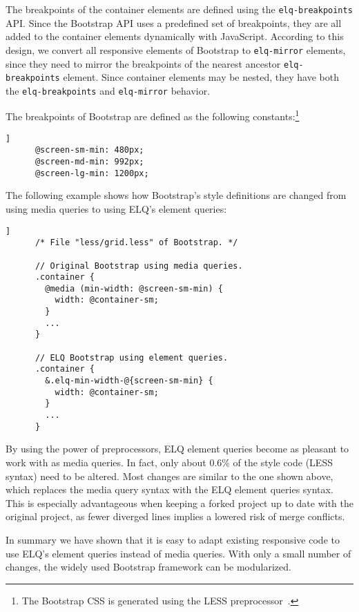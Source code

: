 \documentclass[sigconf,9pt]{acmart}
\newcommand{\elq}{ELQ}
\newcommand{\code}[1]{\texttt{#1}}
\begin{document}
    The breakpoints of the container elements are defined using the \code{elq-breakpoints} API.
    Since the Bootstrap API uses a predefined set of breakpoints, they are all added to the container elements dynamically with JavaScript.
    According to this design, we convert all responsive elements of Bootstrap to \code{elq-mirror} elements, since they need to mirror the breakpoints of the nearest ancestor \code{elq-breakpoints} element.
    Since container elements may be nested, they have both the \code{elq-breakpoints} and \code{elq-mirror} behavior.

    The breakpoints of Bootstrap are defined as the following constants:\footnote{The Bootstrap CSS is generated using the LESS preprocessor~\cite{lesscss}.}
    \begin{lstlisting}[gobble=6,label={code:bootstrap-less-breakpoints},caption={},captionpos=b]]
      @screen-sm-min: 480px;
      @screen-md-min: 992px;
      @screen-lg-min: 1200px;
    \end{lstlisting}

    The following example shows how Bootstrap's style definitions are changed from using media queries to using \elq{}'s element queries:
    \begin{lstlisting}[gobble=6,label={code:bootstrap-less-breakpoints-usage},caption={},captionpos=b]]
      /* File "less/grid.less" of Bootstrap. */

      // Original Bootstrap using media queries.
      .container {
        @media (min-width: @screen-sm-min) {
          width: @container-sm;
        }
        ...
      }

      // ELQ Bootstrap using element queries.
      .container {
        &.elq-min-width-@{screen-sm-min} {
          width: @container-sm;
        }
        ...
      }
    \end{lstlisting}

    By using the power of preprocessors, \elq{} element queries become as pleasant to work with as media queries.
    In fact, only about 0.6\% of the style code (LESS syntax) need to be altered.
    Most changes are similar to the one shown above, which replaces the media query syntax with the \elq{} element queries syntax.
    This is especially advantageous when keeping a forked project up to date with the original project, as fewer diverged lines implies a lowered risk of merge conflicts.

    In summary we have shown that it is easy to adapt existing responsive code to use \elq{}'s element queries instead of media queries.
    With only a small number of changes, the widely used Bootstrap framework can be modularized.
\end{document}
